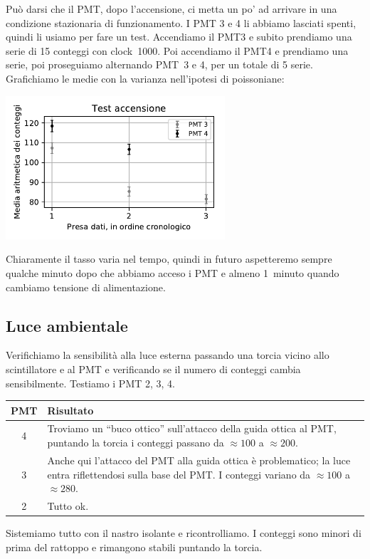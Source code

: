 \documentclass[a4paper]{article}
\begin{document}
Può darsi che il PMT, dopo l'accensione, ci metta un po' ad arrivare in una condizione stazionaria di funzionamento.
I PMT 3 e 4 li abbiamo lasciati spenti, quindi li usiamo per fare un test.
Accendiamo il PMT3 e subito prendiamo una serie di 15 conteggi con clock~1000.
Poi accendiamo il PMT4 e prendiamo una serie, poi proseguiamo alternando PMT~3 e 4,
per un totale di 5 serie. Grafichiamo le medie con la varianza nell'ipotesi di poissoniane:
\begin{center}
	\includegraphics[width=22em]{fig6c}
\end{center}
Chiaramente il tasso varia nel tempo, quindi in futuro aspetteremo sempre qualche minuto dopo che abbiamo acceso i PMT e almeno 1~minuto quando cambiamo tensione di alimentazione.

\subsection*{Luce ambientale}

Verifichiamo la sensibilità alla luce esterna passando una torcia vicino allo scintillatore e al PMT e verificando se il numero di conteggi cambia sensibilmente.
Testiamo i PMT 2, 3, 4.
\begin{center}
\begin{tabular}{c|p{50ex}}
	PMT & Risultato \\
	\hline
	4 &
	Troviamo un ``buco ottico'' sull'attacco della guida ottica al PMT,
	puntando la torcia i conteggi passano da $\approx 100$ a $\approx 200$. \\
	3 &
	Anche qui l'attacco del PMT alla guida ottica è problematico;
	la luce entra riflettendosi sulla base del PMT.
	I conteggi variano da $\approx 100$ a $\approx 280$.\\
	2 &
	Tutto ok.
\end{tabular}
\end{center}
Sistemiamo tutto con il nastro isolante e ricontrolliamo.
I conteggi sono minori di prima del rattoppo e rimangono stabili puntando la torcia.
\end{document}
